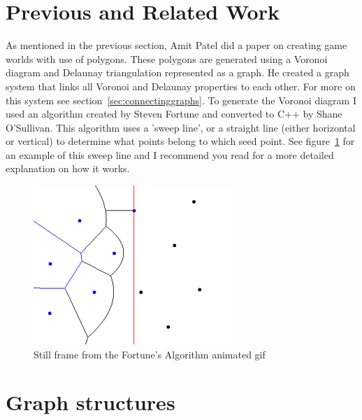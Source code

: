 \documentclass[11pt,a4paper,twocolumn]{article}
\begin{document}
\section{Previous and Related Work}
As mentioned in the previous section, Amit Patel did a paper on creating game worlds with use of polygons\cite{patel}. These polygons are generated using a Voronoi diagram and Delaunay triangulation represented as a graph. He created a graph system that links all Voronoi and Delaunay properties to each other. For more on this system see section~\ref{sec:connectinggraphs}. To generate the Voronoi diagram I used an algorithm created by Steven Fortune\cite{fortuneacm}\cite{fortunewiki} and converted to C++ by Shane O'Sullivan\cite{sullivancpp}. This algorithm uses a 'sweep line', or a straight line (either horizontal or vertical) to determine what points belong to which seed point. See figure~\ref{fig:fortune} for an example of this sweep line and I recommend you read \cite{fortunewiki} for a more detailed explanation on how it works. 
\begin{figure}
	\centering
	\includegraphics[scale=0.6]{images/fortune.png}
	\caption{Still frame from the Fortune's Algorithm animated gif \cite{fortunewiki}}\label{fig:fortune}
\end{figure}
\section{Graph structures}
\end{document}
